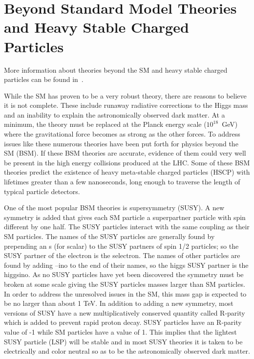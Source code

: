 \section{Beyond Standard Model Theories and Heavy Stable Charged Particles \label{sec:BSM}}
More information about theories beyond the SM and heavy stable charged particles can be found in~\cite{Martin:1997ns, Tata:1997uf, Fairbairn:2006gg}.

While the SM has proven to be a very robust theory, there are reasons to believe it is not complete. These include runaway
radiative corrections to the Higgs mass and an inability to explain the astronomically observed dark matter.
At a minimum, the theory must be replaced at the Planck energy scale ($10^{18}$~GeV)
where the gravitational force becomes as strong as the other forces. To address issues like these numerous
theories have been put forth for physics beyond the SM (BSM). 
If these BSM theories are accurate, evidence of them could very well be present in the high energy collisions produced at the LHC.
Some of these BSM theories predict the existence of heavy meta-stable
charged particles (HSCP) with lifetimes greater than a few nanoseconds, long enough to traverse the length of typical particle detectors. 

One of the most popular BSM theories is supersymmetry (SUSY). A new symmetry is added that gives
each SM particle a superpartner particle with spin different by one half. The SUSY particles interact with the same coupling as their SM particles.
The names of the SUSY particles are generally found by prepending an s (for scalar) to the SUSY partners of spin 1/2 particles;
so the SUSY partner of the electron is the selectron. The names of other particles are found by adding --ino to the end of their names,
so the higgs SUSY partner is the higgsino.
As no SUSY particles have yet been discovered the
symmetry must be broken at some scale giving the SUSY particles masses larger than SM particles. In order to address the unresolved issues in the SM, this mass gap is
expected to be no larger than about 1 TeV. In addition to adding a new symmetry, most versions of SUSY have a new multiplicatively conserved quantity called R-parity
which is added to prevent rapid proton decay.
SUSY particles have an R-parity value of -1 while SM particles have a value of 1. This implies that the lightest SUSY particle (LSP) will be stable and in most
SUSY theories it is taken to be electrically and color neutral so as to be the astronomically observed dark matter.

